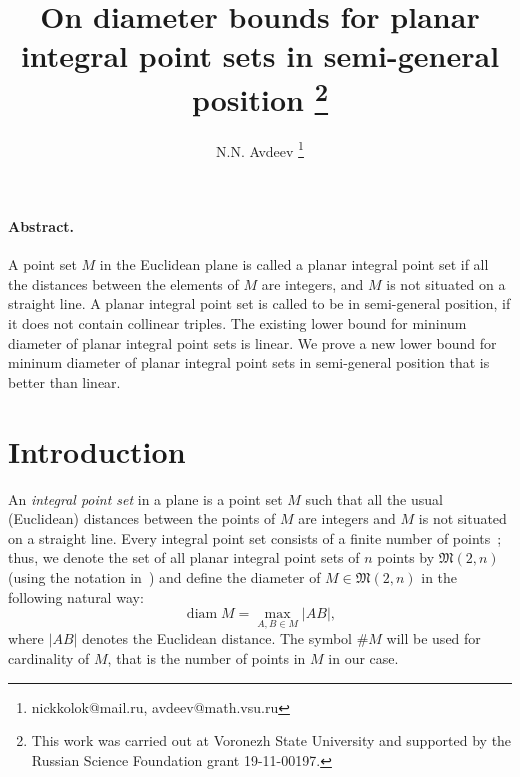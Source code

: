 \documentclass[a4paper,14pt]{article} %
\theoremstyle{plain}
\theoremstyle{definition}
\begin{document}

\title{
	On diameter bounds for planar integral point sets in semi-general position
	\footnote{
		This work was carried out at Voronezh State University and supported by the Russian Science
		Foundation grant 19-11-00197.
	}
}

\author{
	N.N. Avdeev
	\footnote{nickkolok@mail.ru, avdeev@math.vsu.ru}
}

\maketitle

\paragraph{Abstract.}
A point set $M$ in the Euclidean plane is called a planar integral point set if all the distances between the
elements of $M$ are integers, and $M$ is not situated on a straight line.
A planar integral point set is called to be in semi-general position, if it does not contain collinear triples.
The existing lower bound for mininum diameter of planar integral point sets is linear.
We prove a new lower bound for mininum diameter of planar integral point sets in semi-general position
that is better than linear.



\section{Introduction}



An \textit{integral point set} in a plane is a point set $M$ such that all the usual (Euclidean) distances between the
points of $M$ are integers and $M$ is not situated on a straight line.
Every integral point set consists of a finite number of points~\cite{anning1945integral,erdos1945integral};
thus, we denote the set of all planar integral point sets of $n$ points by
$\mathfrak{M}(2,n)$ (using the notation in~\cite{our-vmmsh-2018})
and define the diameter of $M\in\mathfrak{M}(2,n)$ in the following natural way:
\begin{equation}
	\operatorname{diam} M = \max_{A,B\in M} |AB|
	,
\end{equation}
where $|AB|$ denotes the Euclidean distance.
The symbol $\# M$ will be used for cardinality of $M$, that is the number of points in $M$ in our case.
\end{document}
